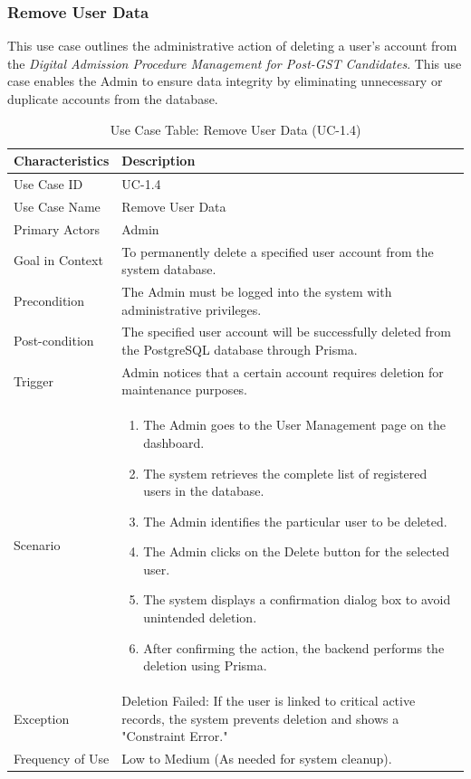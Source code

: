 \subsubsection{Remove User Data}

This use case outlines the administrative action of deleting a user’s account from the \textit{Digital Admission Procedure Management for Post-GST Candidates}. This use case enables the Admin to ensure data integrity by eliminating unnecessary or duplicate accounts from the database.

\begin{table}[!htbp]
    \centering
    \small
    \renewcommand{\arraystretch}{1.4}
    \caption{Use Case Table: Remove User Data (UC-1.4)}
    \label{tab:use_case_remove_user}
    
    \begin{tabularx}{\textwidth}{|l|X|}
        \hline
        \rowcolor[gray]{0.9} {Characteristics} & {Description} \\ \hline
        Use Case ID & UC-1.4 \\ \hline
        Use Case Name & Remove User Data \\ \hline
        Primary Actors & Admin \\ \hline
        Goal in Context & To permanently delete a specified user account from the system database. \\ \hline
        Precondition & The Admin must be logged into the system with administrative privileges. \\ \hline
        Post-condition & The specified user account will be successfully deleted from the PostgreSQL database through Prisma. \\ \hline
        Trigger & Admin notices that a certain account requires deletion for maintenance purposes. \\ \hline
        Scenario & 
        \begin{enumerate}[nosep, leftmargin=*]
            \item The Admin goes to the User Management page on the dashboard.
            \item The system retrieves the complete list of registered users in the database.
            \item The Admin identifies the particular user to be deleted.
            \item The Admin clicks on the Delete button for the selected user.
            \item The system displays a confirmation dialog box to avoid unintended deletion.
            \item After confirming the action, the backend performs the deletion using Prisma.
        \end{enumerate} \\ \hline
        Exception & {Deletion Failed:} If the user is linked to critical active records, the system prevents deletion and shows a "Constraint Error." \\ \hline
        Frequency of Use & Low to Medium (As needed for system cleanup). \\ \hline
    \end{tabularx}
\end{table}
\FloatBarrier